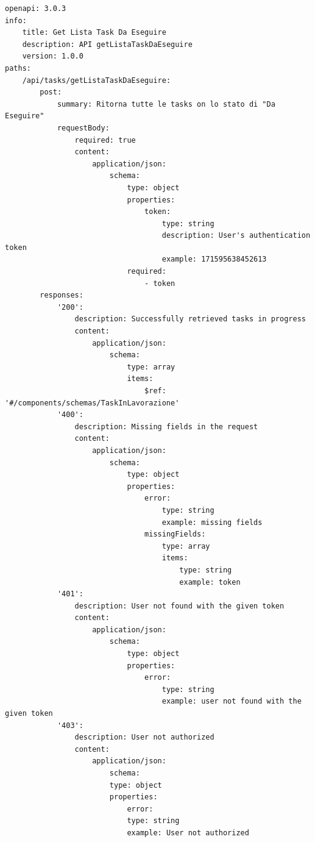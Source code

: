 \documentclass{report}
\begin{document}
\begin{verbatim}
openapi: 3.0.3
info:
    title: Get Lista Task Da Eseguire
	description: API getListaTaskDaEseguire
	version: 1.0.0
paths:
	/api/tasks/getListaTaskDaEseguire:
	    post:
	        summary: Ritorna tutte le tasks on lo stato di "Da Eseguire"
	        requestBody:
	            required: true
	            content:
	                application/json:
	                    schema:
	                        type: object
	                        properties:
	                            token:
	                                type: string
	                                description: User's authentication token
	                                example: 171595638452613
	                        required:
	                            - token
	    responses:
	        '200':
	            description: Successfully retrieved tasks in progress
	            content:
	                application/json:
	                    schema:
	                        type: array
	                        items:
	                            $ref: '#/components/schemas/TaskInLavorazione'
	        '400':
	            description: Missing fields in the request
	            content:
	                application/json:
	                    schema:
	                        type: object
	                        properties:
	                            error:
	                                type: string
	                                example: missing fields
	                            missingFields:
	                                type: array
	                                items:
	                                    type: string
	                                    example: token
	        '401':
	            description: User not found with the given token
	            content:
	                application/json:
	                    schema:
	                        type: object
	                        properties:
	                            error:
	                                type: string
	                                example: user not found with the given token
	        '403':
	            description: User not authorized
	            content:
	                application/json:
	                    schema:
	                    type: object
	                    properties:
	                        error:
	                        type: string
	                        example: User not authorized
	
\end{verbatim}
\end{document}

